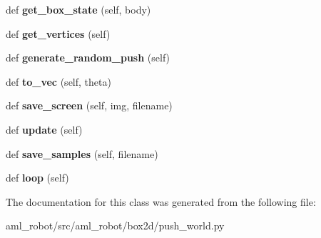 \begin{DoxyCompactItemize}
def {\bfseries get\+\_\+box\+\_\+state} (self, body)
\item 
\hypertarget{classaml__robot_1_1box2d_1_1push__world_1_1_push_world_af12f001bb801639724724c78169fd86c}{}\label{classaml__robot_1_1box2d_1_1push__world_1_1_push_world_af12f001bb801639724724c78169fd86c} 
def {\bfseries get\+\_\+vertices} (self)
\item 
\hypertarget{classaml__robot_1_1box2d_1_1push__world_1_1_push_world_a0d83546f0dc3d70f7deff3c480c4d481}{}\label{classaml__robot_1_1box2d_1_1push__world_1_1_push_world_a0d83546f0dc3d70f7deff3c480c4d481} 
def {\bfseries generate\+\_\+random\+\_\+push} (self)
\item 
\hypertarget{classaml__robot_1_1box2d_1_1push__world_1_1_push_world_a5d784bc298b48ec2a0cfee359729acaf}{}\label{classaml__robot_1_1box2d_1_1push__world_1_1_push_world_a5d784bc298b48ec2a0cfee359729acaf} 
def {\bfseries to\+\_\+vec} (self, theta)
\item 
\hypertarget{classaml__robot_1_1box2d_1_1push__world_1_1_push_world_a5bb6d6f4a9a42567d3705aaf8b8aa9f2}{}\label{classaml__robot_1_1box2d_1_1push__world_1_1_push_world_a5bb6d6f4a9a42567d3705aaf8b8aa9f2} 
def {\bfseries save\+\_\+screen} (self, img, filename)
\item 
\hypertarget{classaml__robot_1_1box2d_1_1push__world_1_1_push_world_a6bd1f5c99548a4ec324203a92998d862}{}\label{classaml__robot_1_1box2d_1_1push__world_1_1_push_world_a6bd1f5c99548a4ec324203a92998d862} 
def {\bfseries update} (self)
\item 
\hypertarget{classaml__robot_1_1box2d_1_1push__world_1_1_push_world_a3bf637e39b52b4a73c00c5676e62920a}{}\label{classaml__robot_1_1box2d_1_1push__world_1_1_push_world_a3bf637e39b52b4a73c00c5676e62920a} 
def {\bfseries save\+\_\+samples} (self, filename)
\item 
\hypertarget{classaml__robot_1_1box2d_1_1push__world_1_1_push_world_ae9d56560f41a833cd974e421cd82a1d4}{}\label{classaml__robot_1_1box2d_1_1push__world_1_1_push_world_ae9d56560f41a833cd974e421cd82a1d4} 
def {\bfseries loop} (self)
\end{DoxyCompactItemize}


The documentation for this class was generated from the following file\+:\begin{DoxyCompactItemize}
\item 
aml\+\_\+robot/src/aml\+\_\+robot/box2d/push\+\_\+world.\+py\end{DoxyCompactItemize}
